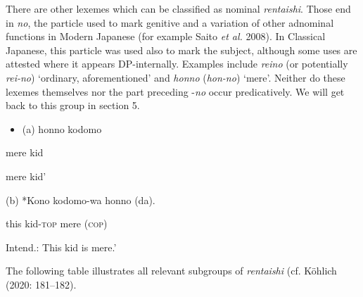 \documentclass[output=paper]{langscibook}
\begin{document}
There are other lexemes which can be classified as nominal \textit{rentaishi}. Those end in \textit{no}, the particle used to mark genitive and a variation of other adnominal functions in Modern Japanese (for example Saito \textit{et al.} 2008). In Classical Japanese, this particle was used also to mark the subject, although some uses are attested where it appears DP-internally. Examples include \textit{reino} (or potentially \textit{rei-no}) ‘ordinary, aforementioned' and \textit{honno} (\textit{hon-no}) ‘mere’. Neither do these lexemes themselves nor the part preceding -\textit{no} occur predicatively. We will get back to this group in section 5.

\begin{itemize}
\item \begin{styleBeispielCinqueKapitel}
(a) honno kodomo
\end{styleBeispielCinqueKapitel}
\end{itemize}
\begin{styleBeispielCinqueKapitel}
mere kid
\end{styleBeispielCinqueKapitel}

\begin{styleBeispielCinqueKapitel}
{\textasciigrave}mere kid' \citep[122]{Nagano2015}
\end{styleBeispielCinqueKapitel}

\begin{styleBeispielCinqueKapitel}
(b) *Kono kodomo-wa honno (da).
\end{styleBeispielCinqueKapitel}

\begin{styleBeispielCinqueKapitel}
this kid-\textsc{top} mere (\textsc{cop})
\end{styleBeispielCinqueKapitel}

\begin{styleBeispielCinqueKapitel}
Intend.: {\textasciigrave}This kid is mere.’
\end{styleBeispielCinqueKapitel}

The following table illustrates all relevant subgroups of \textit{rentaishi} (cf. Köhlich (2020: 181–182).
\end{document}
